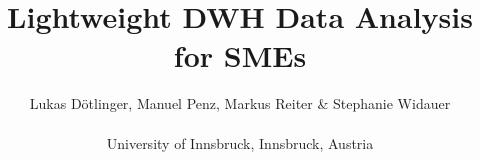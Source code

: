 \usepackage{lmodern}
\usepackage[english]{babel}

\usepackage{fontspec}

\usepackage{multicol}

\usepackage{listings}

\usepackage{graphicx}
\graphicspath{{assets/}}

\title{Lightweight DWH Data Analysis for SMEs}
\author{Lukas Dötlinger, Manuel Penz, Markus Reiter \& Stephanie Widauer \\
  \\
  University of Innsbruck, Innsbruck, Austria
}
\date{}